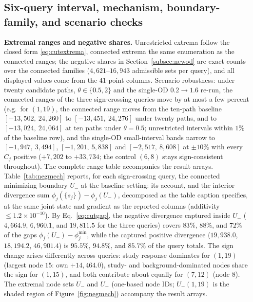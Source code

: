 \subsection{Six-query interval, mechanism, boundary-family, and
scenario checks}\label{supp:newodaccuracy}


\textbf{Extremal ranges and negative shares.}
Unrestricted extrema follow the closed form \eqref{eq:cutextrema},
connected extrema the same enumeration as the connected ranges; the
negative shares in Section~\ref{subsec:newod} are exact counts over
the connected families ($4{,}621$--$16{,}943$ admissible sets per
query), and all displayed values come from the $41$-point columns.
Scenario robustness: under twenty candidate paths, $\theta\in\{0.5,2\}$
and the single-OD $0.2\to1.6$ re-run, the connected ranges of the
three sign-crossing queries move by at most a few percent (e.g.\ for
$(1,19)$, the connected range moves from the ten-path baseline
$[-13{,}502,\ 24{,}260]$ to $[-13{,}451,\ 24{,}276]$ under twenty
paths, and to $[-13{,}024,\ 24{,}064]$ at ten paths under
$\theta=0.5$; unrestricted intervals within $1\%$ of the baseline
row), and the single-OD
small-interval bands narrow to $[-1{,}947,\ 3{,}494]$, $[-1{,}201,\
5{,}838]$ and $[-2{,}517,\ 8{,}608]$ at $\pm10\%$ with every $C_j$
positive ($+7{,}202$ to $+33{,}734$; the control $(6,8)$ stays
sign-consistent throughout). The complete range table accompanies the
result arrays.
Table~\ref{tab:negmech} reports, for each sign-crossing query, the
connected minimizing boundary $U_-$ at the baseline setting: its
account, and the interior divergence sum
$\phi_j(\{s_j\})-\phi_j(U_-)$, decomposed as the table caption
specifies, at the same joint state and gradient as the reported
columns (additivity $\le1.2\times10^{-10}$).
By Eq.~\eqref{eq:cutgap}, the negative divergence captured inside
$U_-$ ($4{,}664.9$, $6{,}960.1$, and $19{,}811.5$ for the three
queries) covers $83\%$, $88\%$, and $72\%$ of the gaps
$\phi_j(U_-)-\phi_j^{\min}$, while the captured positive divergence
($19{,}938.0$, $18{,}194.2$, $46{,}901.4$) is $95.5\%$, $94.8\%$,
and $85.7\%$ of the query totals. The sign change arises
differently across queries: study response
dominates for $(1,19)$ (largest node $15$: own $+14{,}464.0$),
study- and background-dominated nodes share the sign for $(1,15)$,
and both contribute about equally for $(7,12)$ (node $8$). The
extremal node sets $U_-$ and $U_+$ (one-based node IDs; $U_-(1,19)$
is the shaded region of Figure~\ref{fig:negmech}) accompany the
result arrays.

